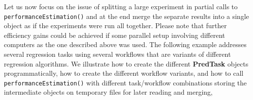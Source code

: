 \documentclass[10pt,a4paper]{article}\usepackage[]{graphicx}\usepackage[]{color}
\begin{document}
\vspace*{0.5cm}

Let us now focus on the issue of splitting a large experiment in partial calls to \texttt{performanceEstimation()} and at the end merge the separate results into a single object as if the experiments were run all together. Please note that further efficiency gains could be achieved if some parallel setup involving different computers as the one described above was used. The following example addresses several regression tasks using several workflows that are variants of different regression algorithms. We illustrate how to create the different \textbf{PredTask} objects programmatically,  how to create the different workflow variants, and how to call \texttt{performanceEstimation()} with different task/workflow combinations storing the intermediate objects on temporary files for later reading and merging,
\end{document}
